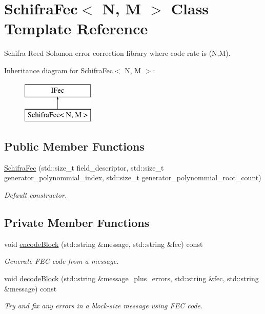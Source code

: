 \hypertarget{classefb_1_1SchifraFec}{
\section{SchifraFec$<$ N, M $>$ Class Template Reference}
\label{classefb_1_1SchifraFec}
}


Schifra Reed Solomon error correction library where code rate is (N,M).  


Inheritance diagram for SchifraFec$<$ N, M $>$:\begin{figure}[H]
\begin{center}
\leavevmode
\includegraphics[height=2.000000cm]{classefb_1_1SchifraFec}
\end{center}
\end{figure}
\subsection*{Public Member Functions}
\begin{DoxyCompactItemize}
\item 
\hyperlink{classefb_1_1SchifraFec_a352db1b7b8e96bb147f25eb286c9969b}{SchifraFec} (std::size\_\-t field\_\-descriptor, std::size\_\-t generator\_\-polynommial\_\-index, std::size\_\-t generator\_\-polynommial\_\-root\_\-count)
\begin{DoxyCompactList}\small\item\em Default constructor. \item\end{DoxyCompactList}\end{DoxyCompactItemize}
\subsection*{Private Member Functions}
\begin{DoxyCompactItemize}
\item 
void \hyperlink{classefb_1_1SchifraFec_abfa614d594bf4d7c86b6a8817f35dec5}{encodeBlock} (std::string \&message, std::string \&fec) const 
\begin{DoxyCompactList}\small\item\em Generate FEC code from a message. \item\end{DoxyCompactList}\item 
void \hyperlink{classefb_1_1SchifraFec_a00958e2a880e71ba6a8b6a0e8f560c45}{decodeBlock} (std::string \&message\_\-plus\_\-errors, std::string \&fec, std::string \&message) const 
\begin{DoxyCompactList}\small\item\em Try and fix any errors in a block-\/size message using FEC code. \item\end{DoxyCompactList}\end{DoxyCompactItemize}

